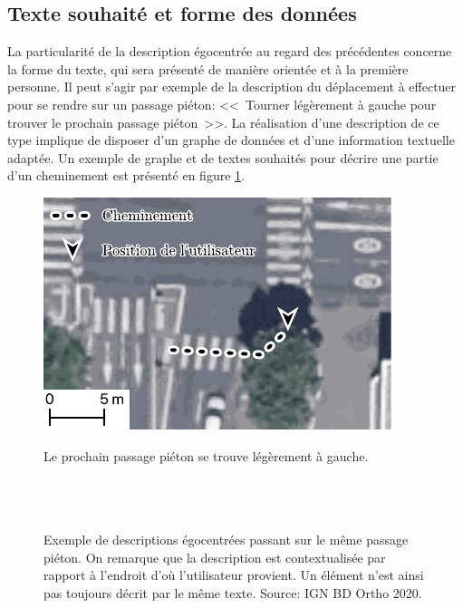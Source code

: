 \subsection{Texte souhaité et forme des données}

La particularité de la description égocentrée au regard des précédentes concerne la forme du texte, qui sera présenté de manière orientée et à la première personne. Il peut s'agir par exemple de la description du déplacement à effectuer pour se rendre sur un passage piéton: <<~Tourner légèrement à gauche pour trouver le prochain passage piéton~>>. La réalisation d'une description de ce type implique de disposer d'un graphe de données et d'une information textuelle adaptée. Un exemple de graphe et de textes souhaités pour décrire une partie d'un cheminement est présenté en figure \ref{fig:experimentation_description_egocentree}.

\begin{figure}[ht]
    \begin{minipage}[b]{0.45\linewidth}
        \centering
        \includegraphics[width=0.8\linewidth]{images/experimentation/ortho_carrefour_ego.pdf} 
    \end{minipage}
    \begin{minipage}[b]{0.45\linewidth}
        \footnotesize
        Le prochain passage piéton se trouve légèrement à gauche.\\\\\\\\
    \end{minipage}
    \caption[Exemple de description égocentrée]{Exemple de descriptions égocentrées passant sur le même passage piéton. On remarque que la description est contextualisée par rapport à l'endroit d'où l'utilisateur provient. Un élément n'est ainsi pas toujours décrit par le même texte. Source: IGN BD Ortho 2020.}
    \label{fig:experimentation_description_egocentree}
\end{figure}

